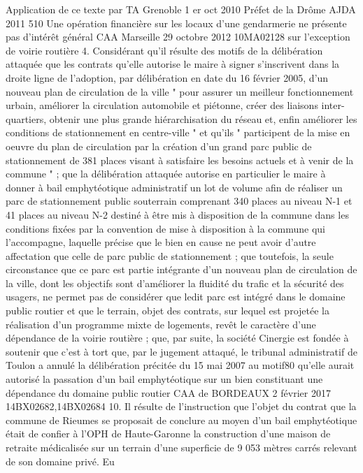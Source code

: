 \documentclass[11pt,a4paper]{report}
\begin{document}
Application de ce texte par TA Grenoble 1 er oct 2010 Préfet de la Drôme AJDA 2011 510 Une opération
financière sur les locaux d’une gendarmerie ne présente pas d’intérêt général
CAA Marseille 29 octobre 2012 \No  10MA02128 sur l’exception de voirie routière
4. Considérant qu'il résulte des motifs de la délibération attaquée que les contrats qu'elle autorise le maire à
signer s'inscrivent dans la droite ligne de l'adoption, par délibération en date du 16 février 2005, d'un nouveau
plan de circulation de la ville " pour assurer un meilleur fonctionnement urbain, améliorer la circulation
automobile et piétonne, créer des liaisons inter-quartiers, obtenir une plus grande hiérarchisation du réseau et,
enfin améliorer les conditions de stationnement en centre-ville " et qu'ils " participent de la mise en oeuvre du
plan de circulation par la création d'un grand parc public de stationnement de 381 places visant à satisfaire les
besoins actuels et à venir de la commune " ; que la délibération attaquée autorise en particulier le maire à
donner à bail emphytéotique administratif un lot de volume  afin de réaliser un parc de stationnement
public souterrain comprenant 340 places au niveau N-1 et 41 places au niveau N-2 destiné à être mis à
disposition de la commune dans les conditions fixées par la convention de mise à disposition à la commune qui
l'accompagne, laquelle précise que le bien en cause ne peut avoir d'autre affectation que celle de parc public de
stationnement ; que toutefois, la seule circonstance que ce parc est partie intégrante d'un nouveau plan de
circulation de la ville, dont les objectifs sont d'améliorer la fluidité du trafic et la sécurité des usagers, ne permet
pas de considérer que ledit parc est intégré dans le domaine public routier et que le terrain, objet des contrats,
sur lequel est projetée la réalisation d'un programme mixte de logements, revêt le caractère d'une dépendance
de la voirie routière ; que, par suite, la société Cinergie est fondée à soutenir que c'est à tort que, par le
jugement attaqué, le tribunal administratif de Toulon a annulé la délibération précitée du 15 mai 2007 au motif80
qu'elle aurait autorisé la passation d'un bail emphytéotique sur un bien constituant une dépendance du domaine
public routier
CAA de BORDEAUX 2 février 2017 \No  14BX02682,14BX02684
10. Il résulte de l'instruction que l'objet du contrat que la commune de Rieumes se proposait de conclure au
moyen d'un bail emphytéotique était de confier à l'OPH de Haute-Garonne la construction d'une maison de
retraite médicalisée sur un terrain d'une superficie de 9 053 mètres carrés relevant de son domaine privé. Eu
\end{document}
